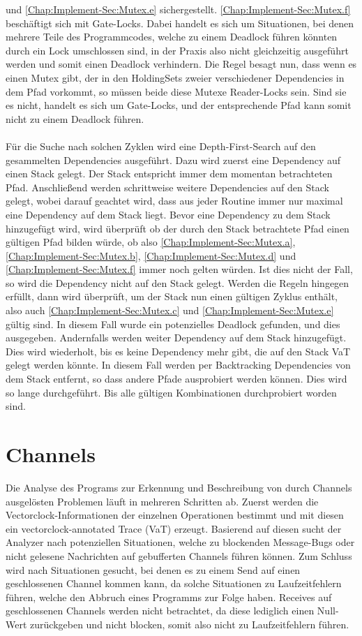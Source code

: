 und \eqref{Chap:Implement-Sec:Mutex.e} sichergestellt.
\eqref{Chap:Implement-Sec:Mutex.f} beschäftigt sich mit Gate-Locks. 
Dabei handelt es sich um Situationen, bei denen mehrere Teile des Programmcodes,
welche zu einem Deadlock führen könnten durch ein Lock umschlossen sind, 
in der Praxis also nicht gleichzeitig ausgeführt werden und somit einen Deadlock 
verhindern.
Die Regel besagt nun, dass wenn es einen Mutex gibt,
der in den HoldingSets zweier verschiedener Dependencies in dem Pfad vorkommt, so müssen
beide diese Mutexe Reader-Locks sein. Sind sie es nicht, handelt es sich um Gate-Locks, und
der entsprechende Pfad kann somit nicht zu einem Deadlock führen.\\\\
Für die Suche nach solchen Zyklen wird eine Depth-First-Search auf den gesammelten 
Dependencies ausgeführt. Dazu wird zuerst eine Dependency auf einen Stack gelegt. 
Der Stack entspricht immer dem momentan
betrachteten Pfad. Anschließend werden schrittweise weitere Dependencies auf den 
Stack gelegt, wobei darauf geachtet wird, dass aus jeder Routine immer nur maximal 
eine Dependency auf dem Stack liegt. Bevor eine Dependency zu dem Stack 
hinzugefügt wird, wird überprüft ob der durch den Stack betrachtete Pfad 
einen gültigen Pfad bilden würde, ob also \eqref{Chap:Implement-Sec:Mutex.a}, 
\eqref{Chap:Implement-Sec:Mutex.b}, \eqref{Chap:Implement-Sec:Mutex.d} und 
\eqref{Chap:Implement-Sec:Mutex.f} immer noch gelten würden. Ist dies nicht
der Fall, so wird die Dependency nicht auf den Stack gelegt. Werden die 
Regeln hingegen erfüllt, dann wird überprüft, um der Stack nun einen gültigen
Zyklus enthält, also auch \eqref{Chap:Implement-Sec:Mutex.c} und \eqref{Chap:Implement-Sec:Mutex.e}
gültig sind. In diesem Fall wurde ein potenzielles Deadlock gefunden, und dies 
ausgegeben. Andernfalls werden weiter Dependency auf dem Stack hinzugefügt. 
Dies wird wiederholt, bis es keine Dependency mehr gibt, die auf den Stack VaT
gelegt werden könnte. In diesem Fall werden per Backtracking Dependencies 
von dem Stack entfernt, so dass andere Pfade ausprobiert werden können.
Dies wird so lange durchgeführt. Bis alle gültigen Kombinationen durchprobiert 
worden sind.

\section{Channels}\label{Chap:Analyse-Sec:Channel}
Die Analyse des Programs zur Erkennung und Beschreibung von durch Channels ausgelösten 
Problemen läuft in mehreren Schritten ab. Zuerst werden die Vectorclock-Informationen 
der einzelnen Operationen bestimmt und mit diesen ein vectorclock-annotated Trace 
(VaT) erzeugt. Basierend auf diesen sucht der Analyzer nach potenziellen 
Situationen, welche zu blockenden Message-Bugs oder nicht gelesene
Nachrichten auf gebufferten Channels führen können. Zum Schluss 
wird nach Situationen gesucht, bei denen es zu einem Send auf einen 
geschlossenen Channel kommen kann, da solche Situationen zu Laufzeitfehlern 
führen, welche den Abbruch eines Programms zur Folge haben.
Receives auf geschlossenen Channels werden nicht betrachtet, da diese 
lediglich einen Null-Wert zurückgeben und nicht blocken, somit also nicht 
zu Laufzeitfehlern führen. 

